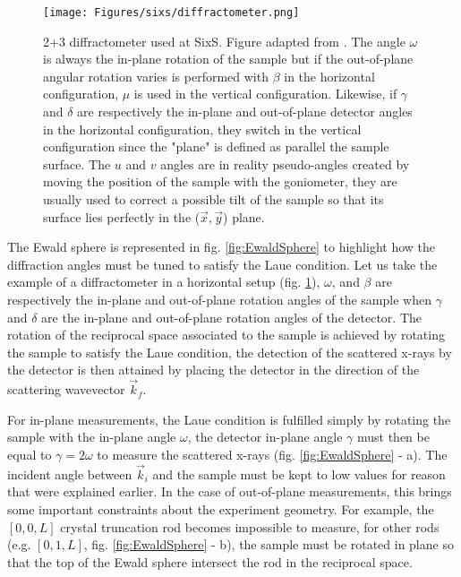 \begin{figure}[!htb]
    \centering
    \texttt{[image: Figures/sixs/diffractometer.png]}
    \caption{
    2+3 diffractometer used at SixS. Figure adapted from \cite{Schleputz2011}.
    The angle $\omega$ is always the in-plane rotation of the sample but if the out-of-plane angular rotation varies is performed with $\beta$ in the horizontal configuration, $\mu$ is used in the vertical configuration.
    Likewise, if $\gamma$ and $\delta$ are respectively the in-plane and out-of-plane detector angles in the horizontal configuration, they switch in the vertical configuration since the "plane" is defined as parallel the sample surface.
    The $u$ and $v$ angles are in reality pseudo-angles created by moving the position of the sample with the goniometer, they are usually used to correct a possible tilt of the sample so that its surface lies perfectly in the ($\vec{x}, \vec{y}$) plane.
    }
    \label{fig:Diffractometer}
\end{figure}

The Ewald sphere is represented in fig. \ref{fig:EwaldSphere} to highlight how the diffraction angles must be tuned to satisfy the Laue condition.
Let us take the example of a diffractometer in a horizontal setup (fig. \ref{fig:Diffractometer}), $\omega$, and $\beta$ are respectively the in-plane and out-of-plane rotation angles of the sample when $\gamma$ and $\delta$ are the in-plane and out-of-plane rotation angles of the detector.
The rotation of the reciprocal space associated to the sample is achieved by rotating the sample to satisfy the Laue condition, the detection of the scattered x-rays by the detector is then attained by placing the detector in the direction of the scattering wavevector $\vec{k}_f$.

For in-plane measurements, the Laue condition is fulfilled simply by rotating the sample with the in-plane angle $\omega$, the detector in-plane angle $\gamma$ must then be equal to $\gamma = 2 \omega$ to measure the scattered x-rays (fig. \ref{fig:EwaldSphere} - a).
The incident angle between $\vec{k}_i$ and the sample must be kept to low values for reason that were explained earlier.
In the case of out-of-plane measurements, this brings some important constraints about the experiment geometry.
For example, the $[0, 0, L]$ crystal truncation rod becomes impossible to measure, for other rods (e.g. $[0, 1, L]$, fig. \ref{fig:EwaldSphere} - b), the sample must be rotated in plane so that the top of the Ewald sphere intersect the rod in the reciprocal space.

